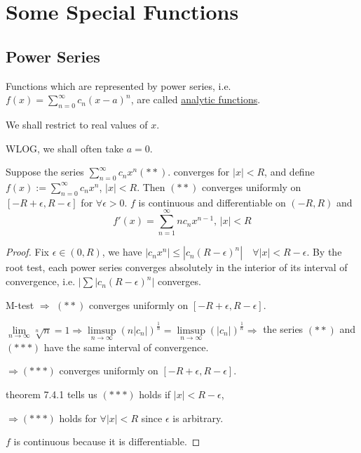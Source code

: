 \section{Some Special Functions}
\subsection{Power Series}
Functions which are represented by power series, i.e. $ f(x)=\sum\limits_{n=0}^{\infty} c_n(x-a)^n  $, are called \underline{analytic functions}.

We shall restrict to real values of  $ x $.

WLOG, we shall often take  $ a=0 $.
\begin{theorem}
    Suppose the series $ \sum\limits_{n=0 }^{\infty } c_nx^n (\ast\ast) $.
    converges for  $ |x|<R $, and define  $ f(x):=\sum\limits_{n=0}^{\infty} c_nx^n $, $ |x|<R $.
    Then  $ (**) $ converges uniformly on  $ [-R+\epsilon,R-\epsilon] $ for  $ \forall \epsilon>0  $.
     $ f  $ is continuous and differentiable on  $ (-R,R) $ and 
     \begin{equation}
        f'(x)=\sum\limits_{n=1}^{\infty} nc_nx^{n-1},\,|x|<R\tag{$ \ast\ast\ast $}
     \end{equation}  
\end{theorem} 
\begin{proof}
    Fix  $ \epsilon\in(0,R) $, we have  $ |c_nx^n| \leqslant |c_n(R-\epsilon)^n|\quad \forall |x|<R-\epsilon $.
    By the root test, each power series converges absolutely in the interior of its interval of convergence, i.e.
     $ |\sum |c_n(R-\epsilon)^n| $ converges.
     
     M-test $ \Rightarrow $  $ (**) $  converges uniformly on  $ [-R+\epsilon,R-\epsilon] $.
     
      $ \lim\limits_{n\to\infty}\sqrt[n]{n}=1  \Rightarrow \limsup\limits_{n\to\infty}(n|c_n|)^{\frac{1}{n}}=\limsup\limits_{n\to\infty}(|c_n|)^{\frac{1}{n}} \Rightarrow $ the series  $ (**) $  and  $ (***) $  have the same interval of convergence.
      
       $ \Rightarrow(\ast\ast\ast) $ converges uniformly on  $ [-R+\epsilon,R-\epsilon] $.
       
       theorem 7.4.1 tells us  $ (***) $  holds if  $ |x|<R-\epsilon $,

        $ \Rightarrow(\ast\ast\ast) $ holds for  $ \forall |x|<R $ since  $ \epsilon $ is arbitrary.

        $ f  $ is continuous because it is differentiable.
\end{proof}
